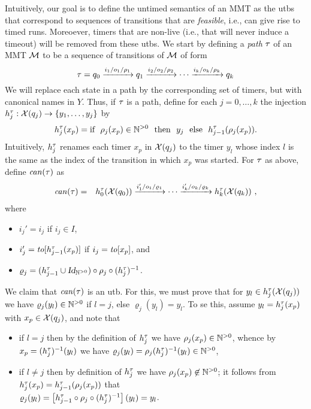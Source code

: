 Intuitively, our goal is to define the untimed semantics of an MMT as the utbs
that correspond to sequences of transitions that are {\em feasible}, i.e.,
can give rise to timed runs. Moreoever, timers that are non-live (i.e., that will
never induce a timeout) will be removed from these utbs.
We start by 
defining a \emph{path} $\tau$ of an MMT ${\mathcal M}$ to be a sequence of
transitions of ${\mathcal M}$ of form
\[
\tau = q_0 \xrightarrow{i_1/o_1/\rho_1} q_1  \xrightarrow{i_2/o_2/\rho_2}
\cdots
\xrightarrow{i_k/o_k/\rho_k} q_k
\]
We will replace each state in a path by the corresponding set of timers,
but with canonical names in $Y$. Thus,
if $\tau$ is a path,  define for each $j = 0, \ldots , k$ the injection
$h_{j}^{\tau}: \mathcal{X}(q_j) \rightarrow \lbrace y_1, \ldots ,y_j\rbrace$
by
\[
h_{j}^{\tau}(x_p) = \mbox{if} \ \ \rho_j(x_p) \in {\mathbb N}^{>0}
\ \ \mbox{then} \ \ y_j
\ \ \mbox{else} \ \
h_{j-1}^{\tau}(\rho_j(x_p)).
\]
Intuitively, $h_{j}^{\tau}$ renames each timer $x_p$
in $\mathcal{X}(q_j)$ to the timer $y_l$ whose index $l$ is the same as
the index of the transition in which $x_p$ was started.
For $\tau$ as above, define $\mathit{can}({\tau})$ as
\begin{eqnarray*}
  \mathit{can}({\tau}) & = & h_{0}^{\tau}(\mathcal{X}(q_0)) \xrightarrow{i_1'/o_1/\varrho_1}
\cdots \xrightarrow{i_k'/o_k/\varrho_k} h_{k}^{\tau}(\mathcal{X}(q_k))
\ ,
\end{eqnarray*}
where
\begin{itemize}
\item
  $i_j'   =  i_j$ if $i_j \in I$,
\item
  $i_j'   = \mathit{to}[h_{j-1}^{\tau}(x_p)]$ if $i_j   = \mathit{to}[x_p]$, and
\item
  $\varrho_j = (h_{j-1}^{\tau} \cup \mbox{\sl Id}_{{\mathbb N}^{>0}}) \circ \rho_j \circ (h_{j}^{\tau})^{-1}$. 
\end{itemize}
We claim that $\mathit{can}({\tau})$ is an utb. For this, we must prove that
for $y_l \in h_{j}^{\tau}(\mathcal{X}(q_j))$ we have $\varrho_j(y_l) \in {\mathbb N}^{>0}$ if $l=j$, else $\varrho_j(y_l) = y_l$.
To se this, assume $y_l = h_{j}^{\tau}(x_p)$ with $x_p \in \mathcal{X}(q_j)$,
and note that
\begin{itemize}
\item if $l=j$ then by the definition of $h_{j}^{\tau}$ we have
  $\rho_j(x_p) \in {\mathbb N}^{>0}$, whence by $x_p = (h_{j}^{\tau})^{-1}(y_l)$
  we have $\varrho_j(y_l) = \rho_j(h_{j}^{\tau})^{-1}(y_l) \in {\mathbb N}^{>0}$,
\item
  if $l \neq j$ then by definition of $h_{j}^{\tau}$ we have
$\rho_j(x_p) \not\in {\mathbb N}^{>0}$; it follows from
$h_{j}^{\tau}(x_p) = h_{j-1}^{\tau}(\rho_j(x_p))$ that
  \\
  $\varrho_j(y_l) =
  \left[h_{j-1}^{\tau} \circ \rho_j \circ (h_{j}^{\tau})^{-1}\right](y_l) = y_l$.
\end{itemize}
